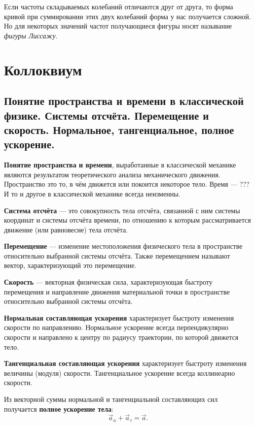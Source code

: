 
Если частоты складываемых колебаний отличаются друг от друга, то форма кривой
при суммировании этих двух колебаний форма у нас получается сложной. Но для
некоторых значений частот получающиеся фигуры носят называние \emph{фигуры
Лиссажу}.

\backmatter
\appendix
\chapter{Коллоквиум}

\section[первый вопрос]{Понятие пространства и времени в классической
  физике. Системы отсчёта.
Перемещение и скорость. Нормальное, тангенциальное, полное ускорение.}

\textbf{Понятие пространства и времени}, выработанные в классической механике
являются результатом теоретического анализа механического движения.
Пространство это то, в чём движется или покоится некоторое тело. Время --- ???
И то и другое в классической механике всегда неизменны.

\textbf{Система отсчёта} --- это совокупность тела отсчёта, связанной с ним
системы координат и системы отсчёта времени, по отношению к которым
рассматривается движение (или равновесие) тела отсчёта.

\textbf{Перемещение} --- изменение местоположения физического тела в
пространстве относительно выбранной системы отсчёта. Также перемещением
называют вектор, характеризующий это перемещение.

\textbf{Скорость} --- векторная физическая сила, характеризующая быстроту
перемещения и направление движения материальной точки в пространстве
относительно выбранной системы отсчёта.

\textbf{Нормальная составляющая ускорения} характеризует быстроту изменения
скорости по направлению. Нормальное ускорение всегда перпендикулярно скорости и
направлено к центру по радиусу траектории, по которой движется тело.

\textbf{Тангенциальная составляющая ускорения} характеризует быстроту изменения
величины (модуля) скорости. Тангенциальное ускорение всегда коллинеарно
скорости.

Из векторной суммы нормальной и тангенциальной составляющих сил получается
\textbf{полное ускорение тела}: \[
  \vec{a}_n + \vec{a}_\tau = \vec{a}
.\]

